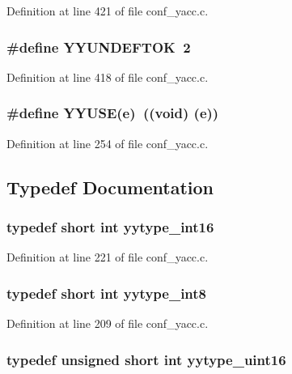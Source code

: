 Definition at line 421 of file conf\_\-yacc.c.
\subsubsection[{YYUNDEFTOK}]{\setlength{\rightskip}{0pt plus 5cm}\#define YYUNDEFTOK~2}\label{conf__yacc_8c_a926181abd06b6d1df27b6133971c24ce}


Definition at line 418 of file conf\_\-yacc.c.
\subsubsection[{YYUSE}]{\setlength{\rightskip}{0pt plus 5cm}\#define YYUSE(e)~((void) (e))}\label{conf__yacc_8c_ad7d1ef1bbc6adfe69894bc8221f557e1}


Definition at line 254 of file conf\_\-yacc.c.

\subsection{Typedef Documentation}
\subsubsection[{yytype\_\-int16}]{\setlength{\rightskip}{0pt plus 5cm}typedef short int {\bf yytype\_\-int16}}\label{conf__yacc_8c_ade5b97f0021a4f6c5922ead3744ab297}


Definition at line 221 of file conf\_\-yacc.c.
\subsubsection[{yytype\_\-int8}]{\setlength{\rightskip}{0pt plus 5cm}typedef short int {\bf yytype\_\-int8}}\label{conf__yacc_8c_afd56a33ef7e59189deccc83706e0becd}


Definition at line 209 of file conf\_\-yacc.c.
\subsubsection[{yytype\_\-uint16}]{\setlength{\rightskip}{0pt plus 5cm}typedef unsigned short int {\bf yytype\_\-uint16}}\label{conf__yacc_8c_a00c27c9da5ed06a830b216c8934e6b28}


